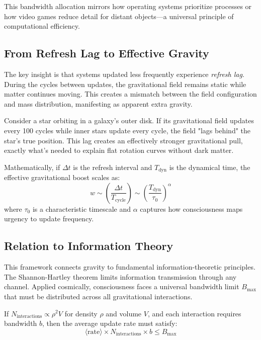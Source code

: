 \documentclass[twocolumn,prd,amsmath,amssymb,aps,superscriptaddress,nofootinbib]{revtex4-2}
\begin{document}
This bandwidth allocation mirrors how operating systems prioritize processes or how video games reduce detail for distant objects---a universal principle of computational efficiency.

\subsection{From Refresh Lag to Effective Gravity}

The key insight is that systems updated less frequently experience \emph{refresh lag}. During the cycles between updates, the gravitational field remains static while matter continues moving. This creates a mismatch between the field configuration and mass distribution, manifesting as apparent extra gravity.

Consider a star orbiting in a galaxy's outer disk. If its gravitational field updates every 100 cycles while inner stars update every cycle, the field "lags behind" the star's true position. This lag creates an effectively stronger gravitational pull, exactly what's needed to explain flat rotation curves without dark matter.

Mathematically, if $\Delta t$ is the refresh interval and $T_{\text{dyn}}$ is the dynamical time, the effective gravitational boost scales as:
\begin{equation}
w \sim \left(\frac{\Delta t}{T_{\text{cycle}}}\right) \sim \left(\frac{T_{\text{dyn}}}{\tau_0}\right)^\alpha
\label{eq:boost_scaling}
\end{equation}
where $\tau_0$ is a characteristic timescale and $\alpha$ captures how consciousness maps urgency to update frequency.

\subsection{Relation to Information Theory}

This framework connects gravity to fundamental information-theoretic principles. The Shannon-Hartley theorem limits information transmission through any channel. Applied cosmically, consciousness faces a universal bandwidth limit $B_{\text{max}}$ that must be distributed across all gravitational interactions.

If $N_{\text{interactions}} \propto \rho^2 V$ for density $\rho$ and volume $V$, and each interaction requires bandwidth $b$, then the average update rate must satisfy:
\begin{equation}
\langle \text{rate} \rangle \times N_{\text{interactions}} \times b \leq B_{\text{max}}
\end{equation}
\end{document}
